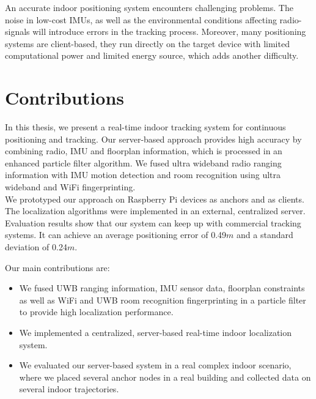 \noindent\hspace*{5mm}%
An accurate indoor positioning system encounters challenging problems. The noise in low-cost IMUs, as well as the environmental conditions affecting radio-signals will introduce errors in the tracking process. Moreover, many positioning systems are client-based, they run directly on the target device with limited computational power and limited energy source, which adds another difficulty.



\section{Contributions}

In this thesis, we present a real-time indoor tracking system for continuous positioning and tracking. Our server-based approach provides high accuracy by combining radio, IMU and floorplan information, which is processed in an enhanced particle filter algorithm. We fused ultra wideband radio ranging information with IMU motion detection and room recognition using ultra wideband and WiFi fingerprinting. \\
\noindent\hspace*{5mm}%
We prototyped our approach on Raspberry Pi devices as anchors and as clients. The localization algorithms were implemented in an external, centralized server.
Evaluation results show that our system can keep up with commercial tracking systems. It can achieve an average positioning error of 0.49$m$ and a standard deviation of 0.24$m$.

Our main contributions are:
\begin{itemize}
\item We fused UWB ranging information, IMU sensor data, floorplan constraints as well as WiFi and UWB room recognition fingerprinting in a particle filter to provide high localization performance. 
\item We implemented a centralized, server-based real-time indoor localization system.
\item We evaluated our server-based system in a real complex indoor scenario, where we placed several anchor nodes in a real building and collected data on several indoor trajectories. 
\end{itemize}



